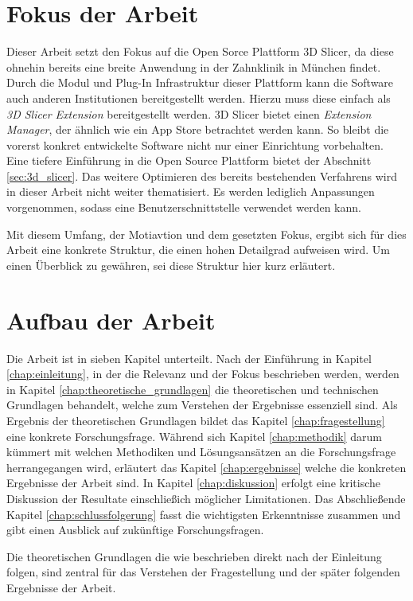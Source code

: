 \section{Fokus der Arbeit}
\label{sec:fokus_der-arbeit} Dieser Arbeit setzt den Fokus auf die Open Sorce Plattform
3D Slicer, da diese ohnehin bereits eine breite Anwendung in der Zahnklinik in
München findet. Durch die Modul und Plug-In Infrastruktur dieser Plattform kann die
Software auch anderen Institutionen bereitgestellt werden. Hierzu muss diese
einfach als \textit{3D Slicer Extension} bereitgestellt werden. 3D Slicer bietet
einen \textit{Extension Manager}, der ähnlich wie ein App Store betrachtet
werden kann. So bleibt die vorerst konkret entwickelte Software nicht nur einer Einrichtung
vorbehalten. Eine tiefere Einführung in die Open Source Plattform bietet der
Abschnitt \ref{sec:3d_slicer}. Das weitere Optimieren des bereits bestehenden Verfahrens
wird in dieser Arbeit nicht weiter thematisiert. Es werden lediglich Anpassungen
vorgenommen, sodass eine Benutzerschnittstelle verwendet werden kann.

Mit diesem Umfang, der Motiavtion und dem gesetzten Fokus, ergibt sich für dies Arbeit
eine konkrete Struktur, die einen hohen Detailgrad aufweisen wird. Um einen Überblick
zu gewähren, sei diese Struktur hier kurz erläutert.

\section{Aufbau der Arbeit}
\label{sec:aufbau_der_arbeit} Die Arbeit ist in sieben Kapitel unterteilt. Nach der
Einführung in Kapitel \ref{chap:einleitung}, in der die Relevanz und der Fokus
beschrieben werden, werden in Kapitel \ref{chap:theoretische_grundlagen} die theoretischen
und technischen Grundlagen behandelt, welche zum Verstehen der Ergebnisse
essenziell sind. Als Ergebnis der theoretischen Grundlagen bildet das Kapitel \ref{chap:fragestellung}
eine konkrete Forschungsfrage. Während sich Kapitel \ref{chap:methodik} darum
kümmert mit welchen Methodiken und Lösungsansätzen an die Forschungsfrage
herrangegangen wird, erläutert das Kapitel \ref{chap:ergebnisse} welche die konkreten
Ergebnisse der Arbeit sind. In Kapitel \ref{chap:diskussion} erfolgt eine
kritische Diskussion der Resultate einschließich möglicher Limitationen. Das Abschließende
Kapitel \ref{chap:schlussfolgerung} fasst die wichtigsten Erkenntnisse zusammen und
gibt einen Ausblick auf zukünftige Forschungsfragen.

Die theoretischen Grundlagen die wie beschrieben direkt nach der Einleitung folgen,
sind zentral für das Verstehen der Fragestellung und der später folgenden
Ergebnisse der Arbeit.
